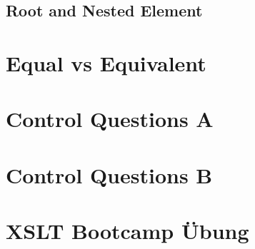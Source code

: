 \documentclass[11pt,DIV=15]{scrreprt}
\begin{document}
\subsection{Root and Nested Element}


\section{Equal vs Equivalent}


\section{Control Questions A}


\section{Control Questions B}











\section{XSLT Bootcamp Übung}













\end{document}
